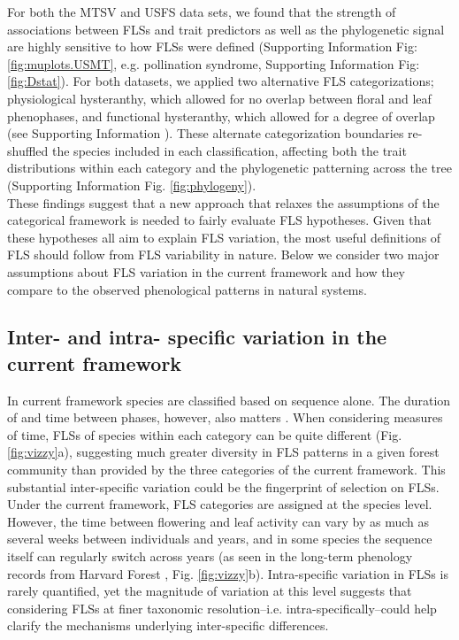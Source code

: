 \documentclass[12pt]{article}
\begin{document}
\noindent For both the MTSV and USFS data sets, we found that the strength of associations between FLSs and trait predictors as well as the phylogenetic signal are highly sensitive to how FLSs were defined (Supporting Information Fig: \ref{fig:muplots.USMT}, e.g. pollination syndrome, Supporting Information Fig: \ref{fig:Dstat}). For both datasets, we applied two alternative FLS categorizations; physiological hysteranthy, which allowed for no overlap between floral and leaf phenophases, and functional hysteranthy, which allowed for a degree of overlap (see Supporting Information ). These alternate categorization boundaries re-shuffled the species included in each classification, affecting both the trait distributions within each category and the phylogenetic patterning across the tree (Supporting Information Fig. \ref{fig:phylogeny}).\\ 
 
\noindent These findings suggest that a new approach that relaxes the assumptions of the categorical framework is needed to fairly evaluate FLS hypotheses. Given that these hypotheses all aim to explain FLS variation, the most useful definitions of FLS should follow from FLS variability in nature. Below we consider two major assumptions about FLS variation in the current framework and how they compare to the observed phenological patterns in natural systems.\\

\subsection*{Inter- and intra- specific variation in the current framework}
\noindent In current framework species are classified based on sequence alone. The duration of and time between phases, however, also matters \citep{Inouye2019}. When considering measures of time, FLSs of species within each category can be quite different (Fig. \ref{fig:vizzy}a), suggesting much greater diversity in FLS patterns in a given forest community than provided by the three categories of the current framework. This substantial inter-specific variation could be the fingerprint of selection on FLSs.\\ 

\noindent Under the current framework, FLS categories are assigned at the species level. However, the time between flowering and leaf activity can vary by as much as several weeks between individuals and years, and in some species the sequence itself can regularly switch across years (as seen in the long-term phenology records from  Harvard Forest \citep{OKeefe2015}, Fig. \ref{fig:vizzy}b). Intra-specific variation in FLSs is rarely quantified, yet the magnitude of variation at this level suggests that considering FLSs at finer taxonomic resolution--i.e. intra-specifically--could help clarify the mechanisms underlying inter-specific differences.\\
\end{document}
